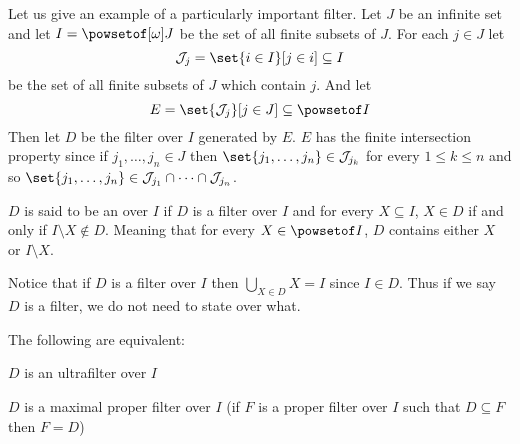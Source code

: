 \documentclass[10pt]{article}
\def\mJ{\mathcal{J}}
\begin{document}
Let us give an example of a particularly important filter.
Let $J$ be an infinite set and let $I=\powsetof[\omega]J$ be the set of all finite subsets of $J$.
For each $j\in J$ let
\[ \mJ_j = \set{i\in I}[j\in i] \subseteq I \]
be the set of all finite subsets of $J$ which contain $j$.
And let
\[ E = \set{\mJ_j}[j\in J] \subseteq \powsetof I \]
Then let $D$ be the filter over $I$ generated by $E$.
$E$ has the finite intersection property since if $j_1,\dots,j_n\in J$ then $\set{j_1,\dots,j_n}\in\mJ_{j_k}$ for every $1\leq k\leq n$ and so $\set{j_1,\dots,j_n}\in\mJ_{j_1}\cap\cdots\cap\mJ_{j_n}$.

\begin{defn*}

    $D$ is said to be an  over $I$ if $D$ is a filter over $I$ and for every $X\subseteq I$, $X\in D$ if and only if $I\setminus X\notin D$.
    Meaning that for every $X\in\powsetof I$, $D$ contains either $X$ or $I\setminus X$.

\end{defn*}

Notice that if $D$ is a filter over $I$ then $\bigcup_{X\in D}X=I$ since $I\in D$.
Thus if we say $D$ is a filter, we do not need to state over what.

\begin{prop*}

    The following are equivalent:
    \benum
        \item $D$ is an ultrafilter over $I$
        \item $D$ is a maximal proper filter over $I$ (if $F$ is a proper filter over $I$ such that $D\subseteq F$ then $F=D$)
    \eenum

\end{prop*}
\end{document}
